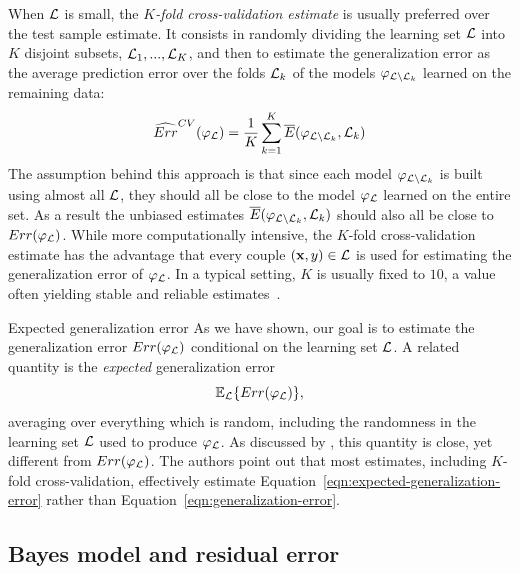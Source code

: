 When ${\cal L}$ is small, the \textit{$K$-fold cross-validation estimate} is
usually preferred over the test sample estimate. It consists in randomly
dividing the learning set ${\cal L}$ into $K$ disjoint subsets, ${\cal
L}_1, ..., {\cal L}_K$, and then to estimate the generalization error as the average prediction error over the folds ${\cal
L}_k$ of the models $\varphi_{{\cal L}\setminus {\cal L}_k}$  learned on the
remaining data:
\begin{equation}\label{eqn:cv-error}
\widehat{Err}^{CV}(\varphi_{\cal L}) = \frac{1}{K} \sum_{k=1}^K  \overline{E}(\varphi_{{\cal L}\setminus{\cal L}_k}, {\cal L}_k)
\end{equation}
The assumption behind this approach is that since each model $\varphi_{{\cal L}\setminus{\cal L}_k}$ is
built using almost all ${\cal L}$, they should all be close to the model
$\varphi_{\cal L}$ learned on the entire set. As a result the unbiased
estimates $\overline{E}(\varphi_{{\cal L}\setminus{\cal L}_k}, {\cal L}_k)$ should also all be close to
$Err(\varphi_{\cal L})$. While more computationally intensive, the $K$-fold
cross-validation estimate has the advantage that every couple $(\mathbf{x}, y)
\in {\cal L}$ is used for estimating the generalization error of $\varphi_{\cal L}$. In
a typical setting, $K$ is usually fixed to $10$, a value often yielding stable
and reliable estimates~\citep{kohavi:1995}.

\begin{remark}{Expected generalization error}
As we have shown, our goal is to estimate the generalization error
$Err(\varphi_{\cal L})$ conditional on the learning set ${\cal L}$. A related
quantity is the \textit{expected} generalization error
\begin{equation}\label{eqn:expected-generalization-error}
\mathbb{E}_{\cal L} \{ Err(\varphi_{\cal L}) \},
\end{equation}
averaging over everything which is random, including the randomness in the
learning set ${\cal L}$ used to produce $\varphi_{\cal L}$. As discussed by
\citet{hastie:2005}, this quantity is close, yet different from
$Err(\varphi_{\cal L})$. The authors point out that most estimates, including $K$-fold
cross-validation, effectively estimate
Equation~\ref{eqn:expected-generalization-error} rather than
Equation~\ref{eqn:generalization-error}.
\end{remark}

\subsection{Bayes model and residual error}
\label{sec:2:bayes-model}

